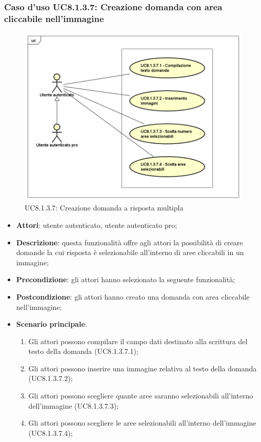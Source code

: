 \subsubsection{Caso d'uso UC8.1.3.7: Creazione domanda con area cliccabile nell'immagine}
\label{UC8.1.3.7}
\begin{figure}[h]
	\centering
	\includegraphics[scale=0.5,keepaspectratio]{UML/UC8_1_3_7.png}
	\caption{UC8.1.3.7: Creazione domanda a risposta multipla}
\end{figure}
\FloatBarrier
\begin{itemize}
	\item \textbf{Attori}: utente autenticato, utente autenticato pro;
	\item \textbf{Descrizione}: questa funzionalità offre agli attori la possibilità di creare domande la cui risposta è selezionabile all'interno di aree cliccabili in un immagine;
	\item \textbf{Precondizione}: gli attori hanno selezionato la seguente funzionalità; 
	\item \textbf{Postcondizione}: gli attori hanno creato una domanda con area cliccabile nell'immagine;
	\item \textbf{Scenario principale}:
		\begin{enumerate}
	       	\item Gli attori possono compilare il campo dati destinato alla scrittura del testo della domanda (UC8.1.3.7.1);
	        \item Gli attori possono inserire una immagine relativa al testo della domanda (UC8.1.3.7.2);
			\item Gli attori possono scegliere quante aree saranno selezionabili all'interno dell'immagine (UC8.1.3.7.3);
			\item Gli attori possono scegliere le aree selezionabili all'interno dell'immagine (UC8.1.3.7.4);
	 	\end{enumerate}
\end{itemize}

